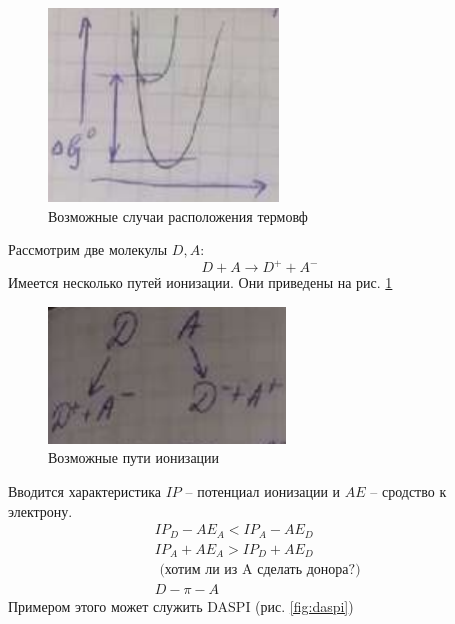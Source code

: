 \begin{lecture}
\begin{lecSection}
\begin{figure}[H]
\begin{minipage}[h]{0.28\linewidth}
		\centering\includegraphics[width=\linewidth]{lecture_04/graph3}
	\end{minipage}
	\caption{Возможные случаи расположения термовф}
	\end{figure}

	Рассмотрим две молекулы $ D, A $:
	\begin{equation*}
		D + A \rightarrow D^{+} + A^{-}
	\end{equation*}
	Имеется несколько путей ионизации. Они приведены на рис. \ref{fig:possible_ways_of_ionization}
	\begin{figure}
		\centering\includegraphics{lecture_04/diag1}
		\caption{Возможные пути ионизации}
		\label{fig:possible_ways_of_ionization}
	\end{figure}
	Вводится характеристика $ IP $ -- потенциал ионизации и $ AE $ -- сродство к электрону.
	\begin{gather*}
		IP_D - AE_A < IP_A - AE_D \\
		IP_A + AE_A > IP_D + AE_D \\
		\text{ (хотим ли из A сделать донора?) } \\
		D - \pi - A
	\end{gather*}
	Примером этого может служить DASPI (рис. \ref{fig:daspi})
	

\end{lecSection}
\end{lecture}
